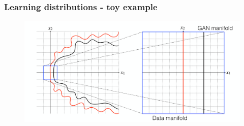 \documentclass{Bredelebeamer}
\begin{document}

\begin{frame}
	\frametitle{Learning distributions - toy example}
	\begin{figure}[h!]
		\centering
		\includegraphics[width=\textwidth]{data_gan_manifold_zoom.png}
	\end{figure}
\end{frame}
\end{document}
